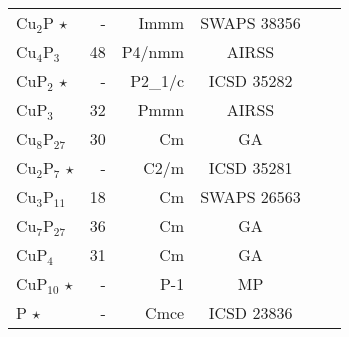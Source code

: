 \begin{tabular}{l r r c l l}
Cu$_\text{2}$P          $\star$   &          -           &        Immm         &          SWAPS 38356           &                                \\  Cu$_\text{4}$P$_\text{3}$               &          48          &        P4/nmm        &             AIRSS              &                                \\        CuP$_\text{2}$          $\star$   &          -           &       P2_1/c        &           ICSD 35282           &                                \\        CuP$_\text{3}$                    &          32          &         Pmmn         &             AIRSS              &                                \\  Cu$_\text{8}$P$_\text{27}$              &          30          &          Cm          &               GA               &                                \\  Cu$_\text{2}$P$_\text{7}$     $\star$   &          -           &        C2/m         &           ICSD 35281           &                                \\  Cu$_\text{3}$P$_\text{11}$              &          18          &          Cm          &          SWAPS 26563           &                                \\  Cu$_\text{7}$P$_\text{27}$              &          36          &          Cm          &               GA               &                                \\        CuP$_\text{4}$                    &          31          &          Cm          &               GA               &                                \\       CuP$_\text{10}$          $\star$   &          -           &        P-1          &               MP               &                                \\              P                 $\star$   &          -           &        Cmce         &           ICSD 23836           &                                \\\end{tabular}